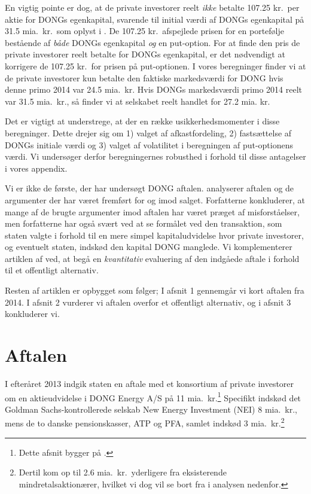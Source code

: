 \documentclass{article}
\begin{document}
En vigtig pointe er dog, at de private investorer reelt \emph{ikke} betalte 107.25 kr.\ per aktie for DONGs egenkapital, svarende til initial værdi af DONGs egenkapital på 31.5 mia.\ kr.\ som oplyst i  \cite{FM2013a}. De 107.25 kr.\ afspejlede prisen for en portefølje bestående af \emph{både} DONGs egenkapital \emph{og} en put-option. For at finde den pris de private investorer reelt betalte for DONGs egenkapital, er det nødvendigt at korrigere de 107.25 kr.\ for prisen på put-optionen. I vores beregninger finder vi at de private investorer kun betalte den faktiske markedsværdi for DONG hvis denne primo 2014 var 24.5 mia.\ kr. Hvis DONGs markedsværdi primo 2014 reelt var 31.5 mia.\ kr., så finder vi at selskabet reelt handlet for 27.2 mia. kr.

Det er vigtigt at understrege, at der en række usikkerhedsmomenter i disse beregninger. Dette drejer sig om 1) valget af afkastfordeling, 2) fastsættelse af DONGs initiale værdi og 3) valget af volatilitet i beregningen af put-optionens værdi. Vi undersøger derfor beregningernes robusthed i forhold til disse antagelser i vores appendix.

Vi er ikke de første, der har undersøgt DONG aftalen. \cite{Bachman2014} analyserer aftalen og de argumenter der har været fremført for og imod salget. Forfatterne konkluderer, at mange af de brugte argumenter imod aftalen har været præget af misforståelser, men forfatterne har også svært ved at se formålet ved den transaktion, som staten valgte i forhold til en mere simpel kapitaludvidelse hvor private investorer, og eventuelt staten, indskød den kapital DONG manglede. Vi komplementerer artiklen af \cite{Bachman2014} ved, at begå en \emph{kvantitativ} evaluering af den indgåede aftale i forhold til et offentligt alternativ. 

Resten af artiklen er opbygget som følger; I afsnit 1 gennemgår vi kort aftalen fra 2014. I afsnit 2 vurderer vi aftalen overfor et offentligt alternativ, og i afsnit 3 konkluderer vi.


\section{Aftalen}
I efteråret 2013 indgik staten en aftale med et konsortium af private investorer om en aktieudvidelse i DONG Energy A/S på 11 mia.\ kr.\footnote{Dette afsnit bygger på \citet{FM2013a}.} Specifikt indskød det Goldman Sachs-kontrollerede selskab New Energy Investment (NEI) 8 mia.\ kr., mens de to danske pensionskasser, ATP og PFA, samlet indskød 3 mia.\ kr.\footnote{Dertil kom op til 2.6 mia.\ kr.\ yderligere fra eksisterende mindretalsaktionærer, hvilket vi dog vil se bort fra i analysen nedenfor.}
\end{document}
